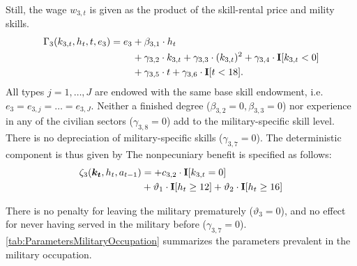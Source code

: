 Still, the wage $w_{3,t}$ is given as the product of the skill-rental price and mility skills.
%
\begin{align}
    \Gamma_3( k_{3,t}, h_t, t, e_3) = e_3 & + \beta_{3,1} \cdot h_t \nonumber \\
	               \nonumber &+ \gamma_{3,2} \cdot  k_{3,t} + \gamma_{3,3} \cdot (k_{3,t})^2 + \gamma_{3,4} \cdot {\textbf{I}}[k_{3,t} < 0] \\
									 & + \gamma_{3,5} \cdot t + \gamma_{3,6} \cdot {\textbf{I}}[t < 18].
\end{align}
%
All types $j = 1, \dots, J$ are endowed with the same base skill endowment, i.e. $e_3 = e_{3,j} = \dots = e_{3, J}$. Neither a finished degree ($\beta_{3,2} = 0, \beta_{3,3} = 0$) nor experience in any of the civilian sectors ($\gamma_{3,8} = 0$) add to the military-specific skill level. There is no depreciation of military-specific skills ($\gamma_{3,7} = 0$). The deterministic component is thus given by
%
The nonpecuniary benefit is specified as follows:
%
\begin{align*}
\zeta_{3}( \bm{k_t}, h_t, a_{t-1} )  & =   + c_{3,2} \cdot {\textbf{I}}[k_{3,t} = 0] \nonumber \\
  & + \vartheta_1 \cdot {\textbf{I}}[h_t \geq 12] + \vartheta_2 \cdot {\textbf{I}}[h_t \geq 16]
\end{align*}

There is no penalty for leaving the military prematurely ($\vartheta_3 = 0$), and no effect for never having served in the military before ($\gamma_{3,7} = 0$).\\

\autoref{tab:ParametersMilitaryOccupation} summarizes the parameters prevalent in the military occupation.

